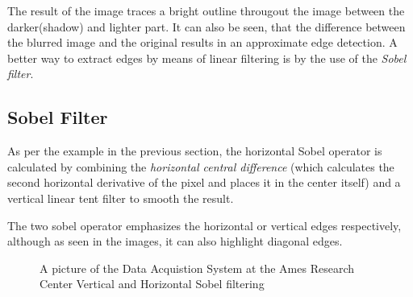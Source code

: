 \documentclass[twoside,a4paper,article]{combine}
\begin{document}
The result of the image traces a bright outline througout the image between the darker(shadow) and lighter part. It can also be seen, that
the difference between the blurred image and the original results in an approximate edge detection. A better way to extract edges by means of linear filtering is
by the use of the \emph{Sobel filter}. \cite{Szeliski_2022}

\subsection{Sobel Filter}As per the example in the previous section, the horizontal Sobel operator is calculated by combining the \emph{horizontal central difference}
(which calculates the second horizontal derivative of the pixel and places it in the center itself) and a vertical linear tent filter to smooth the result.

The two sobel operator emphasizes the horizontal or vertical edges respectively, although as seen in the images, it can also highlight diagonal edges.\\
\begin{minipage}{\textwidth}\begin{figure}[H]
    \centering
    \caption{A picture of the Data Acquistion System at the Ames Research Center Vertical and Horizontal Sobel filtering\cite{NASA_on_The_Commons_2023}}\label{fig:sobel}
\end{figure}\end{minipage}
\end{document}
